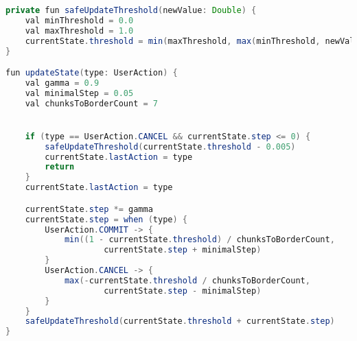 \begin{lstlisting}[caption={Персонализация решающей функции},label={personalization}, language=Java, tabsize=2, basicstyle=\fontsize{10}{10}\selectfont\ttfamily]
private fun safeUpdateThreshold(newValue: Double) {
    val minThreshold = 0.0
    val maxThreshold = 1.0
    currentState.threshold = min(maxThreshold, max(minThreshold, newValue))
}

fun updateState(type: UserAction) {
    val gamma = 0.9
    val minimalStep = 0.05
    val chunksToBorderCount = 7


    if (type == UserAction.CANCEL && currentState.step <= 0) {
        safeUpdateThreshold(currentState.threshold - 0.005)
        currentState.lastAction = type
        return
    }
    currentState.lastAction = type

    currentState.step *= gamma
    currentState.step = when (type) {
        UserAction.COMMIT -> {
            min((1 - currentState.threshold) / chunksToBorderCount,
                    currentState.step + minimalStep)
        }
        UserAction.CANCEL -> {
            max(-currentState.threshold / chunksToBorderCount,
                    currentState.step - minimalStep)
        }
    }
    safeUpdateThreshold(currentState.threshold + currentState.step)
}
\end{lstlisting}
